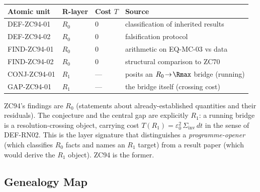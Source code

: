 \documentclass[12pt, a4paper]{article}
\begin{document}
\begin{layerbox}[title={R-Layer Assignments for ZC94}]
{\small\renewcommand{\arraystretch}{1.25}
\begin{center}
\begin{tabular}{@{}llll@{}}
\toprule
Atomic unit & R-layer & Cost $T$ & Source \\
\midrule
DEF-ZC94-01  & $R_0$ & $0$ & classification of inherited results \\
DEF-ZC94-02  & $R_0$ & $0$ & falsification protocol \\
FIND-ZC94-01 & $R_0$ & $0$ & arithmetic on EQ-MC-03 vs data \\
FIND-ZC94-02 & $R_0$ & $0$ & structural comparison to ZC70 \\
CONJ-ZC94-01 & $R_1$ & --- & posits an $R_0\!\to\!\Rmax$ bridge (running) \\
GAP-ZC94-01  & $R_1$ & --- & the bridge itself (crossing cost) \\
\bottomrule
\end{tabular}
\end{center}}
ZC94's findings are $R_0$ (statements about already-established quantities and
their residuals). The conjecture and the central gap are explicitly $R_1$: a
running bridge is a resolution-crossing object, carrying cost
$T(R_1)=\varepsilon_0^2\,\Sigma_{\mathrm{inv}}\,dt$ in the sense of DEF-RN02.
This is the layer signature that distinguishes a \emph{programme-opener} (which
classifies $R_0$ facts and names an $R_1$ target) from a result paper (which
would derive the $R_1$ object). ZC94 is the former.
\end{layerbox}

\subsection{Genealogy Map}
\label{sec:genealogy-zc94}
\end{document}
